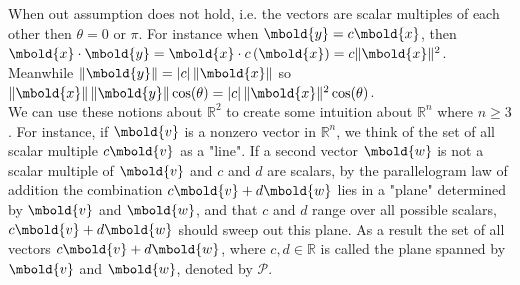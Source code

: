 \documentclass[12pt letter]{report}
\begin{document}
When out assumption does not hold, i.e. the vectors are scalar multiples of each other then $\theta = 0 \text{ or } \pi $. For instance when $\mbold{y} = c \mbold{x} $, then $\mbold{x} \cdot \mbold{y} = \mbold{x} \cdot c \left( \mbold{x} \right) = c \|\mbold{x}\|^2 $. Meanwhile $\|\mbold{y}\| = \left| c \right| \|\mbold{x}\| $ so $\|\mbold{x}\| \,\|\mbold{y}\| \cos(\theta) = \left| c \right|\|\mbold{x}\|^2 \cos(\theta)$.\\

We can use these notions about $\mathbb{R}^2$ to create some intuition about $\mathbb{R}^{n}$ where $n \geq 3$. For instance, if $\mbold{v}$ is a nonzero vector in $\mathbb{R}^{n}$, we think of the set of all scalar multiple $c \mbold{v}$ as a "line". If a second vector $\mbold{w}$ is not a scalar multiple of $\mbold{v}$ and $c$ and $d$ are scalars, by the parallelogram law of addition the combination $c\mbold{v} + d\mbold{w}$ lies in a "plane" determined by $\mbold{v}$ and $\mbold{w}$, and that $c$ and $d$ range over all possible scalars, $c\mbold{v} + d\mbold{w}$ should sweep out this plane. As a result the set of all vectors $c\mbold{v} + d\mbold{w}$, where $c, d \in \mathbb{R}$ is called the plane spanned by $\mbold{v}$ and $\mbold{w}$, denoted by $ \mathcal{P}$.\\
\end{document}
